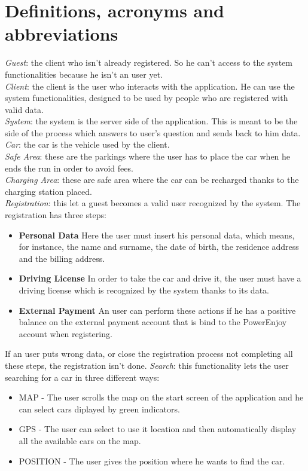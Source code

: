 \documentclass[11pt,a4paper]{report}
\begin{document}
\section{Definitions, acronyms and abbreviations}
\textit{Guest}: the client who isn't already registered. So he can't access to the system functionalities because he isn't an user yet.\\
\textit{Client}: the client is the user who interacts with the application. He can use the system functionalities, designed to be used by people who are registered with valid data.\\
\textit{System}: the system is the server side of the application. This is meant to be the side of the process which answers to user's question and sends back to him data.\\
\textit{Car}: the car is the vehicle used by the client.\\
\textit{Safe Area}: these are the parkings where the user has to place the car when he ends the run in order to avoid fees.\\
\textit{Charging Area}: these are safe area where the car can be recharged thanks to the charging station placed. \\
\textit{Registration}: this let a guest becomes a valid user recognized by the system. The registration has three steps:
	\begin{itemize}
		\item \textbf{Personal Data} Here the user must insert his personal data, which means, for instance, the name and surname, the date of birth, the residence address and the billing address.
		\item \textbf{Driving License} In order to take the car and drive it, the user must have a driving license which is recognized by the system thanks to its data.
		\item \textbf{External Payment} An user can perform these actions if he has a positive balance on the external payment account that is bind to the PowerEnjoy account when registering.
	\end{itemize}	
If an user puts wrong data, or close the registration process not completing all these steps, the registration isn't done.
\textit{Search}: this functionality lets the user searching for a car in three different ways:
	\begin{itemize}
		\item MAP - The user scrolls the map on the start screen of the application and he can select cars diplayed by green indicators.
		\item GPS - The user can select to use it location and then automatically display all the available cars on the map.
		\item POSITION - The user gives the position where he wants to find the car.
	\end{itemize}
\end{document}
